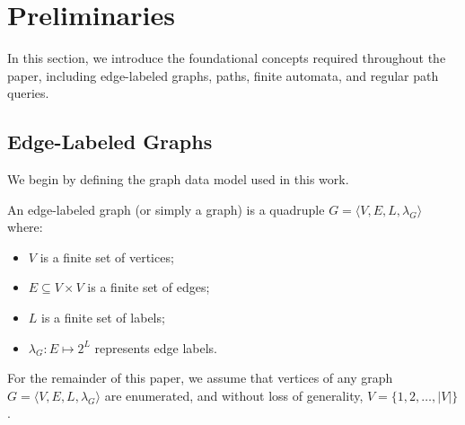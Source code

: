 \section{Preliminaries}\label{sec:preliminaries}

In this section, we introduce the foundational concepts required throughout the paper, including edge-labeled graphs, paths, finite automata, and regular path queries.

\subsection{Edge-Labeled Graphs}

We begin by defining the graph data model used in this work.

\begin{definition}
	An edge-labeled graph (or simply a graph) is a quadruple $G = \langle V, E, L, \lambda_G \rangle$ where:
	\begin{itemize}
		\item $V$ is a finite set of vertices;
		\item $E \subseteq V \times V$ is a finite set of edges;
		\item $L$ is a finite set of labels;
		\item $\lambda_G: E \mapsto 2^L$ represents edge labels.
	\end{itemize}
\end{definition}

For the remainder of this paper, we assume that vertices of any graph $G = \langle V, E, L, \lambda_G \rangle$ are enumerated, and without loss of generality, $V = \{1, 2, \ldots, |V|\}$.

